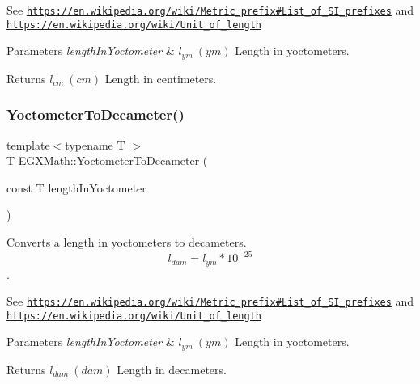 See \href{https://en.wikipedia.org/wiki/Metric_prefix#List_of_SI_prefixes}{\tt https\+://en.\+wikipedia.\+org/wiki/\+Metric\+\_\+prefix\#\+List\+\_\+of\+\_\+\+S\+I\+\_\+prefixes} and \href{https://en.wikipedia.org/wiki/Unit_of_length}{\tt https\+://en.\+wikipedia.\+org/wiki/\+Unit\+\_\+of\+\_\+length} 
\begin{DoxyParams}{Parameters}
{\em length\+In\+Yoctometer} & $ l_{ym}\ (ym)$ Length in yoctometers. \\
\hline
\end{DoxyParams}
\begin{DoxyReturn}{Returns}
$ l_{cm}\ (cm)$ Length in centimeters. 
\end{DoxyReturn}
\mbox{\label{group___e_g_x_math-_conversions-_length_conversions-_yoctometer-_s_i_ga63fd1a1af694ca9e3afdefb16cbeffd8}} 
\subsubsection{\texorpdfstring{Yoctometer\+To\+Decameter()}{YoctometerToDecameter()}}
{\footnotesize\ttfamily template$<$typename T $>$ \\
T E\+G\+X\+Math\+::\+Yoctometer\+To\+Decameter (\begin{DoxyParamCaption}\item[{const T}]{length\+In\+Yoctometer }\end{DoxyParamCaption})}



Converts a length in yoctometers to decameters. \[ l_{dam}=l_{ym} * 10^{-25} \]. 

See \href{https://en.wikipedia.org/wiki/Metric_prefix#List_of_SI_prefixes}{\tt https\+://en.\+wikipedia.\+org/wiki/\+Metric\+\_\+prefix\#\+List\+\_\+of\+\_\+\+S\+I\+\_\+prefixes} and \href{https://en.wikipedia.org/wiki/Unit_of_length}{\tt https\+://en.\+wikipedia.\+org/wiki/\+Unit\+\_\+of\+\_\+length} 
\begin{DoxyParams}{Parameters}
{\em length\+In\+Yoctometer} & $ l_{ym}\ (ym)$ Length in yoctometers. \\
\hline
\end{DoxyParams}
\begin{DoxyReturn}{Returns}
$ l_{dam}\ (dam)$ Length in decameters. 
\end{DoxyReturn}
\mbox{\label{group___e_g_x_math-_conversions-_length_conversions-_yoctometer-_s_i_ga958e0eaa8ecc89db32a3f8189136360c}} 
